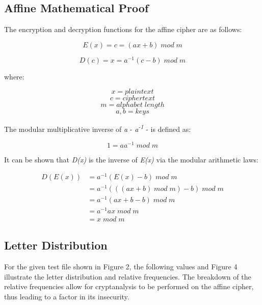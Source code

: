 \documentclass[]{article}
\begin{document}
\newpage
\subsection*{Affine Mathematical Proof}

The encryption and decryption functions for the affine cipher are as follows:

$$E(x)=c=(ax+b)\;mod\;m$$

$$D(c)=x=a^{-1}(c-b)\;mod\;m$$

\noindent
where:

$$x = plaintext$$
$$c = ciphertext$$
$$m = alphabet\;length$$
$$a,b=keys$$
\vspace{0.5cm}

\noindent
The modular multiplicative inverse of \textit{a} - \textit{a\textsuperscript{-1}} -  is defined as:

$$1=aa^{-1}\;mod\;m$$

\noindent
It can be shown that \textit{D(x)} is the inverse of \textit{E(x)} via the modular arithmetic laws:

\begin{equation*}
\begin{split}
D(E(x)) & = a^{-1}(E(x)-b)\;mod\;m \\
& = a^{-1}(( (ax+b)\;mod\;m )-b)\;mod\;m \\
& = a^{-1} (ax+b-b) \;mod\;m \\
& = a^{-1}ax\;mod\;m \\
& = x\;mod\;m
\end{split}
\end{equation*}

\newpage
\subsection*{Letter Distribution}

For the given test file shown in Figure 2, the following values and Figure 4 illustrate the letter distribution and relative frequencies. The breakdown of the relative frequencies allow for cryptanalysis to be performed on the affine cipher, thus leading to a factor in its insecurity.
\end{document}
